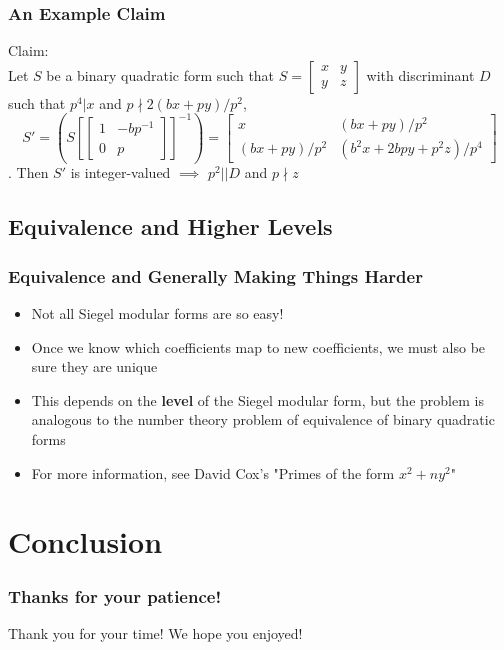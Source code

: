 \documentclass[11pt]{beamer}
\begin{document}
\begin{frame}
\frametitle{An Example Claim}
Claim:
\\
Let $S$ be a binary quadratic form such that $S=
\begin{bmatrix}
x &	y \\
y & z
\end{bmatrix}$ with discriminant $D$ 
such that $p^4\vert x$ and $p\nmid 2(bx+py)/p^2$, $$S'=(S[
\begin{bmatrix}
1 &	-bp^{-1} \\
0 & p
\end{bmatrix}
]^{-1})=\begin{bmatrix}
x &	(bx +py)/p^2 \\
(bx+py)/p^2 & (b^2x+2bpy+p^2z)/p^4
\end{bmatrix}$$. Then $S'$ is integer-valued $\implies$ $p^2\vert\vert D$ and $p\nmid z$

\end{frame}

\subsection{Equivalence and Higher Levels}
\begin{frame}
\frametitle{Equivalence and Generally Making Things Harder}
\begin{itemize}
\item Not all Siegel modular forms are so easy!
\item Once we know which coefficients map to new coefficients, we must also be sure they are unique
\item This depends on the \textbf{level} of the Siegel modular form, but the problem is analogous to the number theory problem of equivalence of binary quadratic forms
\item For more information, see David Cox's "Primes of the form $x^2+ny^2$"
\end{itemize}
\end{frame}

\section{Conclusion}
\begin{frame}
\frametitle{Thanks for your patience!}
Thank you for your time! We hope you enjoyed!
\end{frame}
\end{document}
